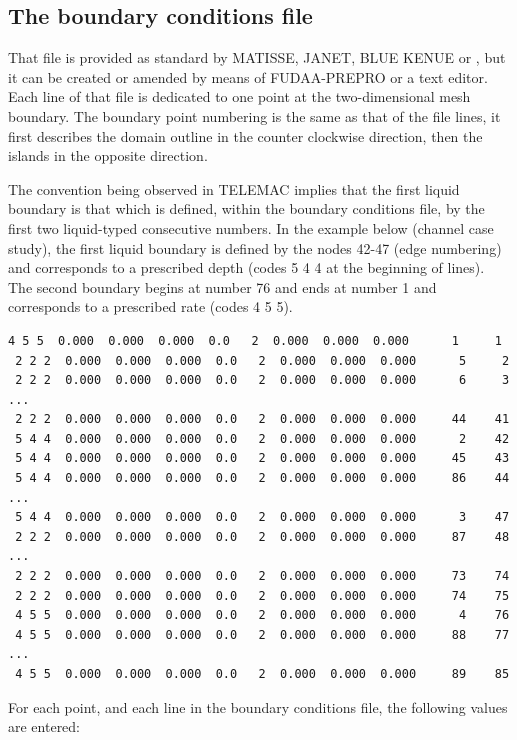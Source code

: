 \subsection{The boundary conditions file}
\label{sec:bndfile}
That file is provided as standard by MATISSE, JANET, BLUE KENUE or \stbtel, but
it can be created or amended by means of FUDAA-PREPRO or a text editor. Each
line of that file is dedicated to one point at the two-dimensional mesh
boundary. The boundary point numbering is the same as that of the file lines,
it first describes the domain outline in the counter clockwise direction, then
the islands in the opposite direction.

The convention being observed in TELEMAC implies that the first liquid boundary
is that which is defined, within the boundary conditions file, by the first two
liquid-typed consecutive numbers. In the example below (channel case study),
the first liquid boundary is defined by the nodes 42-47 (edge numbering) and
corresponds to a prescribed depth (codes 5 4 4 at the beginning of lines). The
second boundary begins at number 76 and ends at number 1 and corresponds to a
prescribed rate (codes 4 5 5).

\begin{lstlisting}[language=bash]
 4 5 5  0.000  0.000  0.000  0.0   2  0.000  0.000  0.000      1     1
 2 2 2  0.000  0.000  0.000  0.0   2  0.000  0.000  0.000      5     2
 2 2 2  0.000  0.000  0.000  0.0   2  0.000  0.000  0.000      6     3
...
 2 2 2  0.000  0.000  0.000  0.0   2  0.000  0.000  0.000     44    41
 5 4 4  0.000  0.000  0.000  0.0   2  0.000  0.000  0.000      2    42
 5 4 4  0.000  0.000  0.000  0.0   2  0.000  0.000  0.000     45    43
 5 4 4  0.000  0.000  0.000  0.0   2  0.000  0.000  0.000     86    44
...
 5 4 4  0.000  0.000  0.000  0.0   2  0.000  0.000  0.000      3    47
 2 2 2  0.000  0.000  0.000  0.0   2  0.000  0.000  0.000     87    48
...
 2 2 2  0.000  0.000  0.000  0.0   2  0.000  0.000  0.000     73    74
 2 2 2  0.000  0.000  0.000  0.0   2  0.000  0.000  0.000     74    75
 4 5 5  0.000  0.000  0.000  0.0   2  0.000  0.000  0.000      4    76
 4 5 5  0.000  0.000  0.000  0.0   2  0.000  0.000  0.000     88    77
...
 4 5 5  0.000  0.000  0.000  0.0   2  0.000  0.000  0.000     89    85
\end{lstlisting}

For each point, and each line in the boundary conditions file, the following
values are entered:


